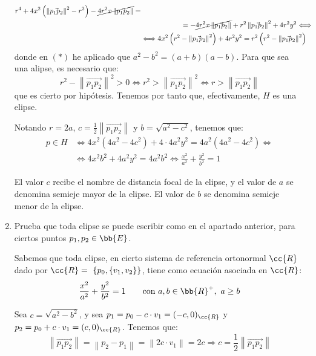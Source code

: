 \begin{ejercicio}
\begin{enumerate}
\begin{align*}
        r^4 + 4x^2\left(\left\|\vec{p_1p_2}\right\|^2-r^2\right) -\cancel{4r^2x\left\|\vec{p_1p_2}\right\|} =\\&\hspace{2cm}= - \cancel{4r^2x\left\|\vec{p_1p_2}\right\|} +r^2\left\|\vec{p_1p_2}\right\|^2 + 4r^2y^2 \Longleftrightarrow \\ & \Longleftrightarrow
        4x^2\left(r^2 - \left\|\vec{p_1p_2}\right\|^2\right) + 4r^2y^2 = r^2\left(r^2 - \left\|\vec{p_1p_2}\right\|^2\right)
    \end{align*}
    donde en $(\ast)$ he aplicado que $a^2-b^2=(a+b)(a-b)$. Para que sea una alipse, es necesario que:
    \begin{equation*}
        r^2 - \left\|\vec{p_1p_2}\right\|^2 > 0 \Longleftrightarrow
        r^2 > \left\|\vec{p_1p_2}\right\|^2 \Longleftrightarrow
        r > \left\|\vec{p_1p_2}\right\|
    \end{equation*}
    que es cierto por hipótesis. Tenemos por tanto que, efectivamente, $H$ es una elipse.
    
    Notando $r=2a$, $c=\frac{1}{2}\left\|\vec{p_1p_2}\right\|$ y $b=\sqrt{a^2-c^2}$, tenemos que:
    \begin{align*}
        p\in H &\Longleftrightarrow 4x^2\left(4a^2 - 4c^2\right) + 4\cdot 4a^2y^2 = 4a^2(4a^2 - 4c^2) \Longleftrightarrow \\ & \Longleftrightarrow
        4x^2b^2 + 4a^2y^2 = 4a^2b^2 \Longleftrightarrow
        \frac{x^2}{a^2} + \frac{y^2}{b^2} = 1
    \end{align*}

    El valor $c$ recibe el nombre de distancia focal de la elipse, y el valor de $a$ se denomina semieje mayor de la elipse.
    El valor de $b$ se denomina semieje menor de la elipse.

    \item Prueba que toda elipse se puede escribir como en el apartado anterior, para ciertos puntos $p_1, p_2 \in \bb{E}$.
    
    Sabemos que toda elipse, en cierto sistema de referencia ortonormal $\cc{R}$ dado por $\cc{R}=~\{p_0, \{v_1, v_2\}\}$, tiene como ecuación asociada en $\cc{R}$:
    \begin{equation*}
        \frac{x^2}{a^2} + \frac{y^2}{b^2} = 1 \qquad \text{con } a,b\in \bb{R}^+,~a\geq b
    \end{equation*}

    Sea $c=\sqrt{a^2-b^2}$, y sea $p_1 = p_0 - c\cdot v_1=(-c,0)_{\cc{R}}$ y $p_2 = p_0  +c\cdot v_1=(c,0)_{\cc{R}}$. Tenemos que:
    \begin{equation*}
        \left\|\vec{p_1p_2}\right\| = \left\|p_2 - p_1\right\| = \left\|2c\cdot v_1\right\|= 2c \Longrightarrow c = \frac{1}{2}\left\|\vec{p_1p_2}\right\|
    \end{equation*}


\end{enumerate}
\end{ejercicio}
